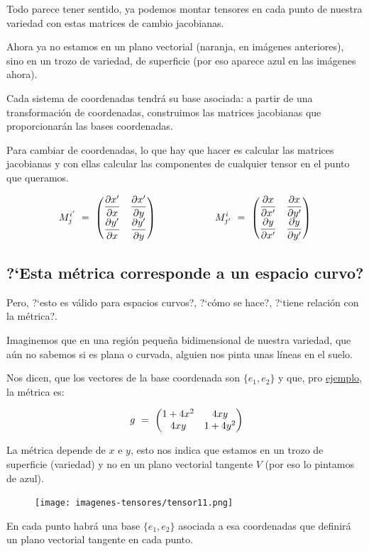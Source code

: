 Todo parece tener sentido, ya podemos montar tensores en cada punto de nuestra variedad con estas matrices de cambio jacobianas.

Ahora ya no estamos en un plano vectorial (naranja, en imágenes anteriores), sino en un trozo de variedad, de superficie (por eso aparece azul en las imágenes ahora).

Cada sistema de coordenadas tendrá su base asociada: a partir de una transformación de coordenadas, construimos las matrices jacobianas que proporcionarán las bases coordenadas.

Para cambiar de coordenadas, lo que hay que hacer es calcular las matrices jacobianas y con ellas calcular las componentes de cualquier tensor en el punto que queramos.

$$M^{i'}_{j} \ = \   \mqty( \displaystyle \pdv{x'}{x} & \displaystyle \pdv{x'}{y} \\ \displaystyle \pdv{y'}{x} & \displaystyle \pdv{y'}{y} )
\qquad \qquad \qquad
M^{i}_{j'} \ = \ \mqty( \displaystyle \pdv{x}{x'} & \displaystyle \pdv{x}{y'} \\ \displaystyle \pdv{y}{x'} & \displaystyle \pdv{y}{y'} ) $$

\subsection{?`Esta métrica corresponde a un espacio curvo?}

Pero, ?`esto es válido para espacios curvos?, ?`cómo se hace?, ?`tiene relación con la métrica?.

Imaginemos que en una región pequeña bidimensional de nuestra variedad, que aún no sabemos si es plana o curvada, alguien nos pinta unas líneas en el suelo.


Nos dicen, que los vectores de la base coordenada son $\{ e_1,e_2 \}$ y que, pro \underline{ejemplo}, la métrica es:

 $$\ g\ = \ \mqty(1+4x^2&4xy\\4xy&1+4y^2)$$

La métrica depende de $x$ e $y$, esto nos indica que estamos en un trozo de superficie (variedad) y no en un plano vectorial tangente $V$ (por eso lo pintamos de azul). 

\begin{figure}[H]
		\centering
		\texttt{[image: imagenes-tensores/tensor11.png]}
	\end{figure}

En cada punto habrá una base $\{ e_1,e_2 \}$ asociada a esa coordenadas que definirá un plano vectorial tangente en cada punto.	

